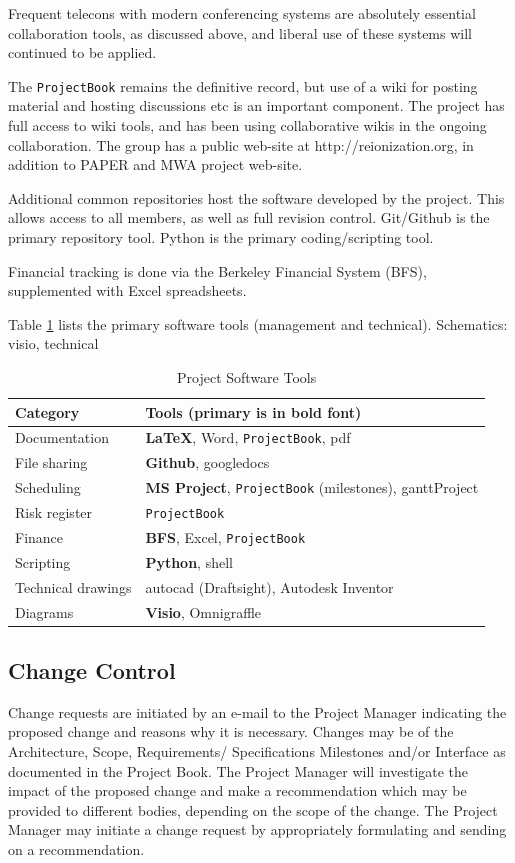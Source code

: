 \documentclass[preprint]{aastex}
\begin{document}
Frequent telecons with modern conferencing systems are absolutely essential collaboration tools, 
as discussed above, and liberal use of these systems will continued to be applied.

The {\tt ProjectBook} remains the definitive record, but use of a wiki for posting material and hosting
discussions etc is an important component.  The project has full access to wiki tools, and has been
using collaborative wikis in the ongoing collaboration.  The group has a public web-site at http://reionization.org, 
in addition to PAPER and MWA project web-site.

Additional common repositories host the software developed by the project.  This allows access to all members,
as well as full revision control.  Git/Github is the primary repository tool.  Python is the primary coding/scripting
tool.

Financial tracking is done via the Berkeley Financial System (BFS), supplemented with Excel spreadsheets.

Table \ref{tab:softwareTools} lists the primary software tools (management and technical).  Schematics:  visio, technical
\begin{table}[h]
\centering
\label{tab:softwareTools}
\caption{Project Software Tools}
\begin{tabular}{| p{1in} | p{5in} |}\hline
\textbf{Category} & \textbf{Tools (primary is in bold font)} \\ \hline
Documentation & \textbf{\LaTeX}, Word, {\tt ProjectBook}, pdf \\ \hline
File sharing & \textbf{Github}, googledocs \\ \hline
Scheduling & \textbf{MS Project}, {\tt ProjectBook} (milestones), ganttProject \\ \hline
Risk register & {\tt ProjectBook}\\ \hline
Finance & \textbf{BFS}, Excel, {\tt ProjectBook} \\ \hline
Scripting & \textbf{Python}, shell \\ \hline
Technical drawings & autocad (Draftsight), Autodesk Inventor \\ \hline
Diagrams & \textbf{Visio}, Omnigraffle \\ \hline
\end{tabular}
\end{table}


\subsection{Change Control}
\label{sec:changecontrol}
Change requests are initiated by an e-mail to the Project Manager indicating the proposed change
and reasons why it is necessary.  Changes may be of the Architecture, Scope, Requirements/ Specifications
Milestones and/or Interface as documented in the Project Book.  The Project Manager will investigate the 
impact of the proposed change and make a recommendation which may be provided to different bodies, 
depending on the scope of the change.  The Project Manager may initiate a change request by appropriately 
formulating and sending on a recommendation.
\end{document}
